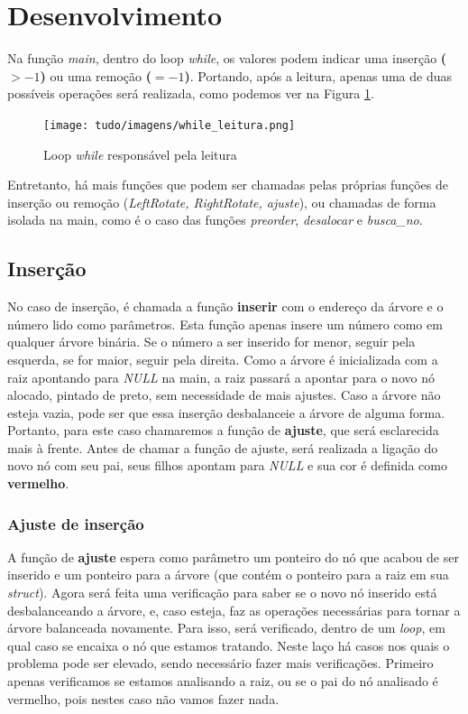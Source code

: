\documentclass[a4paper,11pt]{article}
\begin{document}
\section{Desenvolvimento}
Na função \textit{main}, dentro do loop \textit{while}, os valores podem indicar uma inserção \textbf{($> -1$)} ou uma remoção \textbf{($= -1$)}. Portando, após a leitura, apenas uma de duas possíveis operações será realizada, como podemos ver na Figura \ref{imagem:leitura}.

    \begin{figure}[h]
    \centering
    \texttt{[image: tudo/imagens/while\_leitura.png]}
    \caption{Loop \textit{while} responsável pela leitura}
    \label{imagem:leitura}
    \end{figure}

Entretanto, há mais funções que podem ser chamadas pelas próprias funções de inserção ou remoção (\textit{LeftRotate, RightRotate, ajuste}), ou chamadas de forma isolada na main, como é o caso das funções \textit{preorder}, \textit{desalocar} e \textit{busca\_no}.
\smallskip

\subsection{Inserção}
    No caso de inserção, é chamada a função \textbf{inserir} com o endereço da árvore e o número lido como parâmetros. Esta função apenas insere um número como em qualquer árvore binária. Se o número a ser inserido for menor, seguir pela esquerda, se for maior, seguir pela direita. Como a árvore é inicializada com a raiz apontando para \textit{NULL} na main, a raiz passará a apontar para o novo nó alocado, pintado de preto, sem necessidade de mais ajustes. Caso a árvore não esteja vazia, pode ser que essa inserção desbalanceie a árvore de alguma forma. Portanto, para este caso chamaremos a função de \textbf{ajuste}, que será esclarecida mais à frente. Antes de chamar a função de ajuste, será realizada a ligação do novo nó com seu pai, seus filhos apontam para \textit{NULL} e sua cor é definida como \textbf{vermelho}.
    \subsubsection{Ajuste de inserção}
        A função de \textbf{ajuste} espera como parâmetro um ponteiro do nó que acabou de ser inserido e um ponteiro para a árvore (que contém o ponteiro para a raiz em sua \textit{struct}). Agora será feita uma verificação para saber se o novo nó inserido está desbalanceando a árvore, e, caso esteja, faz as operações necessárias para tornar a árvore balanceada novamente. Para isso, será verificado, dentro de um \textit{loop}, em qual caso se encaixa o nó que estamos tratando. Neste laço há casos nos quais o problema pode ser elevado, sendo necessário fazer mais verificações. Primeiro apenas verificamos se estamos analisando a raiz, ou se o pai do nó analisado é vermelho, pois nestes caso não vamos fazer nada.
\end{document}

